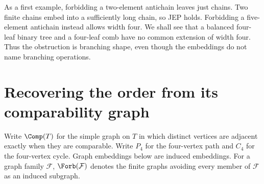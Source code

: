 \documentclass[11pt]{article}
\begin{document}
As a first example, forbidding a two-element antichain leaves just chains.
Two finite chains embed into a sufficiently long chain, so JEP holds.
Forbidding a five-element antichain instead allows width four. We shall
see that a balanced four-leaf binary tree and a four-leaf comb have no
common extension of width four. Thus the obstruction is branching
shape, even though the embeddings do not name branching operations.

\section{Recovering the order from its comparability graph}
Write $\Comp(T)$ for the simple graph on $T$ in which distinct vertices
are adjacent exactly when they are comparable. Write $P_4$ for the
four-vertex path and $C_4$ for the four-vertex cycle. Graph embeddings
below are induced embeddings. For a graph family $\mathcal F$,
$\Forb(\mathcal F)$ denotes the finite graphs avoiding every member of
$\mathcal F$ as an induced subgraph.
\end{document}
